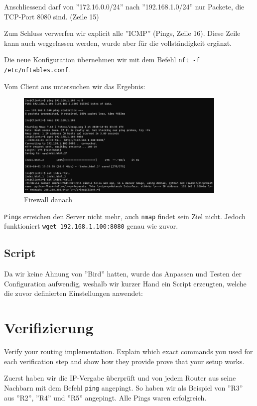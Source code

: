 \documentclass[11pt,titlepage]{article}
\newenvironment{shadedquotation}
 {\begin{shaded*}
  \quoting[leftmargin=0pt, vskip=0pt]
 }
 {\endquoting
 \end{shaded*}
}
\begin{document}
Anschliessend darf von ''172.16.0.0/24'' nach ''192.168.1.0/24'' nur Packete, die TCP-Port 8080 sind. (Zeile 15)

Zum Schluss verwerfen wir explicit alle ''ICMP'' (Pings, Zeile 16). Diese Zeile kann auch weggelassen werden, wurde aber für die vollständigkeit ergänzt.



Die neue Konfiguration übernehmen wir mit dem Befehl \lstinline!nft -f /etc/nftables.conf!.

Vom Client aus untersuchen wir das Ergebnis:
\begin{figure}[H]
  \begin{center}
    \includegraphics[width=0.90\textwidth]{images/firewall-after.png}
    \caption{Firewall danach}
    \label{fig:FirewallBefore}
  \end{center}
\end{figure}

\lstinline!Ping!s erreichen den Server nicht mehr, auch \lstinline!nmap! findet sein Ziel nicht. Jedoch funktioniert \lstinline!wget 192.168.1.100:8080! genau wie zuvor. 

\subsection{Script}
\label{subsec:Script}

Da wir keine Ahnung von ''Bird'' hatten, wurde das Anpassen und Testen der Configuration aufwendig, weshalb wir kurzer Hand ein Script erzeugten, welche die zuvor definierten Einstellungen anwendet:


\newpage

\section{Verifizierung}
\label{sec:Verifizierung}
\begin{shadedquotation}
  Verify your routing implementation. Explain which exact commands you used for each verification step and show how they provide prove that your setup works.
\end{shadedquotation}
Zuerst haben wir die IP-Vergabe überprüft und von jedem Router aus seine Nachbarn mit dem Befehl \lstinline!ping! angepingt. So haben wir als Beispiel von ''R3'' aus ''R2'', ''R4'' und ''R5'' angepingt.
Alle Pings waren erfolgreich.
\end{document}
